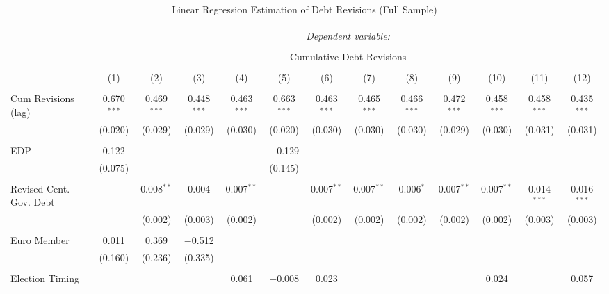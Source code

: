 
\begin{table}[!htbp] \centering 
  \caption{Linear Regression Estimation of Debt Revisions (Full Sample)} 
  \label{debt_results} 
\tiny 
\begin{tabular}{@{\extracolsep{5pt}}lcccccccccccc} 
\\[-1.8ex]\hline 
\hline \\[-1.8ex] 
 & \multicolumn{12}{c}{\textit{Dependent variable:}} \\ 
\cline{2-13} 
\\[-1.8ex] & \multicolumn{12}{c}{Cumulative Debt Revisions} \\ 
\\[-1.8ex] & (1) & (2) & (3) & (4) & (5) & (6) & (7) & (8) & (9) & (10) & (11) & (12)\\ 
\hline \\[-1.8ex] 
 Cum Revisions (lag) & 0.670$^{***}$ & 0.469$^{***}$ & 0.448$^{***}$ & 0.463$^{***}$ & 0.663$^{***}$ & 0.463$^{***}$ & 0.465$^{***}$ & 0.466$^{***}$ & 0.472$^{***}$ & 0.458$^{***}$ & 0.458$^{***}$ & 0.435$^{***}$ \\ 
  & (0.020) & (0.029) & (0.029) & (0.030) & (0.020) & (0.030) & (0.030) & (0.030) & (0.029) & (0.030) & (0.031) & (0.031) \\ 
  & & & & & & & & & & & & \\ 
 EDP & 0.122 &  &  &  & $-$0.129 &  &  &  &  &  &  &  \\ 
  & (0.075) &  &  &  & (0.145) &  &  &  &  &  &  &  \\ 
  & & & & & & & & & & & & \\ 
 Revised Cent. Gov. Debt &  & 0.008$^{**}$ & 0.004 & 0.007$^{**}$ &  & 0.007$^{**}$ & 0.007$^{**}$ & 0.006$^{*}$ & 0.007$^{**}$ & 0.007$^{**}$ & 0.014$^{***}$ & 0.016$^{***}$ \\ 
  &  & (0.002) & (0.003) & (0.002) &  & (0.002) & (0.002) & (0.002) & (0.002) & (0.002) & (0.003) & (0.003) \\ 
  & & & & & & & & & & & & \\ 
 Euro Member & 0.011 & 0.369 & $-$0.512 &  &  &  &  &  &  &  &  &  \\ 
  & (0.160) & (0.236) & (0.335) &  &  &  &  &  &  &  &  &  \\ 
  & & & & & & & & & & & & \\ 
 Election Timing &  &  &  & 0.061 & $-$0.008 & 0.023 &  &  &  & 0.024 &  & 0.057 \\ 

\end{tabular}
\end{table}
